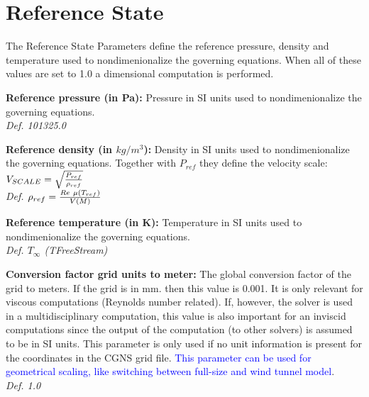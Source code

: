 \documentclass[12pt,epsf,colordvi]{article}
\begin{document}
\section{Reference State  }
The Reference State Parameters define the reference pressure, density and temperature used to nondimenionalize the governing equations. When all of these values are set to 1.0 a dimensional computation is performed. 
%
\begin{description}
	\item{ \bf Reference pressure (in Pa):}  Pressure in SI units used to nondimenionalize the governing equations. \\ 
{ \it Def. 101325.0 } 
%
    \item{ \bf Reference density (in \(kg/m^3\)):} Density in SI units used to nondimenionalize the governing equations. Together with \(P_{ref}\) they define the velocity scale:
 \( V_{SCALE} = \sqrt{P_{ref} \over \rho_{ref} } \) \\

{\it Def. \(\rho_{ref} = {{ Re \ \mu (T_{ref}) } \over { V(M)}}\) }   
%
    \item{ \bf  Reference temperature (in K):} Temperature in SI units used to nondimenionalize the governing equations. \\
{\it Def. \(T_\infty \) (TFreeStream) }
%
     \item{ \bf  Conversion factor grid units to meter:} The global conversion factor of the grid to meters. If  the grid is in mm. then this value is 0.001.   It is only relevant for viscous computations (Reynolds number related). If, however, the solver is used in a multidisciplinary computation, this value is also important for an inviscid computations since the output of the computation (to other solvers) is assumed to be in SI units. This parameter is only used if no unit information is present for the coordinates in the CGNS grid file. \textcolor{blue}{This parameter can be used for geometrical scaling, like switching between full-size and wind tunnel model}.\\
 {\it Def. 1.0 }
%

\end{description}
%
%
\noindent
\end{document}
